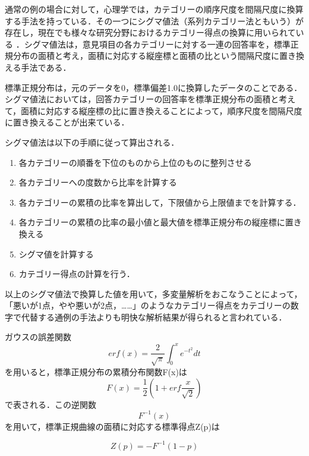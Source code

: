 \documentclass[shuuron]{kuee}
\begin{document}
通常の例の場合に対して，心理学では，カテゴリーの順序尺度を間隔尺度に換算する手法を持っている．その一つにシグマ値法（系列カテゴリー法ともいう）が存在し\cite{likert1932technique}，現在でも様々な研究分野におけるカテゴリー得点の換算に用いられている\cite{シグマ値法使ってる} \cite{岩本隆2016人事}．シグマ値法は，意見項目の各カテゴリーに対する一連の回答率を，標準正規分布の面積と考え，面積に対応する縦座標と面積の比という間隔尺度に置き換える手法である．

標準正規分布は，元のデータを0，標準偏差1.0に換算したデータのことである．シグマ値法においては，回答カテゴリーの回答率を標準正規分布の面積と考えて，面積に対応する縦座標の比に置き換えることによって，順序尺度を間隔尺度に置き換えることが出来ている．

シグマ値法は以下の手順に従って算出される．
\begin{enumerate}
  \item 各カテゴリーの順番を下位のものから上位のものに整列させる
  \item 各カテゴリーへの度数から比率を計算する
  \item 各カテゴリーの累積の比率を算出して，下限値から上限値までを計算する．
  \item 各カテゴリーの累積の比率の最小値と最大値を標準正規分布の縦座標に置き換える
  \item シグマ値を計算する
  \item カテゴリー得点の計算を行う．
\end{enumerate}

以上のシグマ値法で換算した値を用いて，多変量解析をおこなうことによって，「悪いが1点，やや悪いが2点，……」のようなカテゴリー得点をカテゴリーの数字で代替する通例の手法よりも明快な解析結果が得られると言われている．

ガウスの誤差関数
\begin{equation}
  erf(x) = \frac{2}{\sqrt{\pi}}\int_0^x e^{-t^2} dt
\end{equation}
を用いると，標準正規分布の累積分布関数F(x)は
\begin{equation}
  F(x) = \frac{1}{2}(1+erf\frac{x}{\sqrt{2}})
\end{equation}
で表される．この逆関数\begin{equation}F^{-1}(x)\end{equation}を用いて，標準正規曲線の面積に対応する標準得点Z(p)は


\begin{equation}
  Z(p) = -F^{-1}(1-p)
\end{equation}
\end{document}
